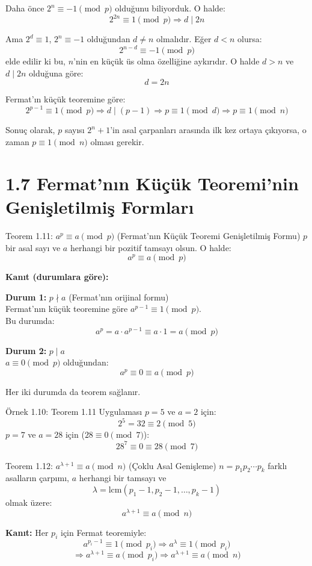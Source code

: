 \documentclass[12pt]{article}
\begin{document}
Daha önce $2^n \equiv -1 \pmod{p}$ olduğunu biliyorduk. O halde:
\[
2^{2n} \equiv 1 \pmod{p} \Rightarrow d \mid 2n
\]

Ama $2^d \equiv 1$, $2^n \equiv -1$ olduğundan $d \ne n$ olmalıdır. Eğer $d < n$ olursa:
\[
2^{n - d} \equiv -1 \pmod{p}
\]
elde edilir ki bu, $n$'nin en küçük üs olma özelliğine aykırıdır. O halde $d > n$ ve $d \mid 2n$ olduğuna göre:
\[
d = 2n
\]

Fermat'ın küçük teoremine göre:
\[
2^{p-1} \equiv 1 \pmod{p} \Rightarrow d \mid (p - 1)
\Rightarrow p \equiv 1 \pmod{d} \Rightarrow p \equiv 1 \pmod{n}
\]

Sonuç olarak, $p$ sayısı $2^n + 1$'in asal çarpanları arasında ilk kez ortaya çıkıyorsa, o zaman $p \equiv 1 \pmod{n}$ olması gerekir.

\section*{1.7 Fermat'nın Küçük Teoremi'nin Genişletilmiş Formları}

\begin{theorembox}{Teorem 1.11: $a^p \equiv a \pmod{p}$ (Fermat'nın Küçük Teoremi Genişletilmiş Formu)}
$p$ bir asal sayı ve $a$ herhangi bir pozitif tamsayı olsun. O halde:
\[
a^p \equiv a \pmod{p}
\]

\textbf{Kanıt (durumlara göre):}

\textbf{Durum 1:} $p \nmid a$ (Fermat'nın orijinal formu)\\
Fermat'nın küçük teoremine göre $a^{p-1} \equiv 1 \pmod{p}$.\\
Bu durumda:
\[
a^p = a \cdot a^{p-1} \equiv a \cdot 1 = a \pmod{p}
\]

\textbf{Durum 2:} $p \mid a$\\
$a \equiv 0 \pmod{p}$ olduğundan:
\[
a^p \equiv 0 \equiv a \pmod{p}
\]

Her iki durumda da teorem sağlanır.
\end{theorembox}

\begin{examplebox}{Örnek 1.10: Teorem 1.11 Uygulaması}
$p = 5$ ve $a = 2$ için:
\[
2^5 = 32 \equiv 2 \pmod{5}
\]
$p = 7$ ve $a = 28$ için ($28 \equiv 0 \pmod{7}$):
\[
28^7 \equiv 0 \equiv 28 \pmod{7}
\]
\end{examplebox}

\begin{theorembox}{Teorem 1.12: $a^{\lambda + 1} \equiv a \pmod{n}$ (Çoklu Asal Genişleme)}
$n = p_1p_2 \cdots p_k$ farklı asalların çarpımı, $a$ herhangi bir tamsayı ve
\[
\lambda = \text{lcm}(p_1 - 1, p_2 - 1, \ldots, p_k - 1)
\]
olmak üzere:
\[
a^{\lambda + 1} \equiv a \pmod{n}
\]

\textbf{Kanıt:} Her $p_i$ için Fermat teoremiyle:
\[
a^{p_i - 1} \equiv 1 \pmod{p_i} \Rightarrow a^\lambda \equiv 1 \pmod{p_i}
\]
\[
\Rightarrow a^{\lambda + 1} \equiv a \pmod{p_i} \Rightarrow a^{\lambda + 1} \equiv a \pmod{n}
\]
\end{theorembox}
\end{document}
